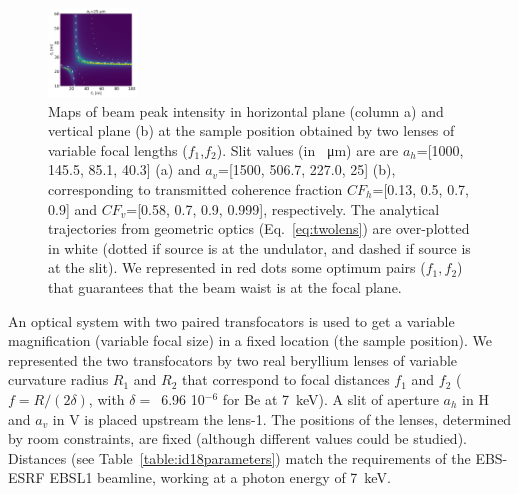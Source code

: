 \documentclass[9pt,twocolumn,twoside]{osajnl}
\begin{document}
\begin{figure}[htbp]
    \includegraphics[width=0.21\textwidth]{figures/V_0.png}
    \caption{
        \label{fig:f1f2map}
    Maps of beam peak intensity in horizontal plane (column a) and vertical plane (b) at the sample position obtained by two lenses of variable focal lengths ($f_1$,$f_2$).
    Slit values (in \SI{}{\micro\meter}) are are $a_h$=[1000, 145.5, 85.1, 40.3] (a) and $a_v$=[1500, 506.7, 227.0, 25] (b), corresponding to transmitted coherence fraction
    $CF_h$=[0.13, 0.5, 0.7, 0.9] and
    $CF_v$=[0.58, 0.7, 0.9, 0.999], respectively.
    The analytical trajectories from geometric optics (Eq.~\ref{eq:twolens}) are over-plotted in white (dotted if source is at the undulator, and dashed if source is at the slit). We represented in red dots some optimum pairs ($f_1,f_2$) that guarantees that the beam waist is at the focal plane.
    }
\end{figure}


An optical system with two paired transfocators is used to get a variable magnification (variable focal size) in a fixed location (the sample position). We represented the two transfocators by two real beryllium lenses of variable curvature radius $R_1$ and $R_2$ that correspond to focal distances $f_1$ and $f_2$ ($f=R/(2 \delta)$, with $\delta=$~6.96 10$^{-6}$ for Be at \SI{7}{keV}). A slit of aperture $a_h$ in H and $a_v$ in V is placed upstream the lens-1. The positions of the lenses, determined by room constraints, are fixed (although different values could be studied). Distances (see Table~\ref{table:id18parameters}) match the requirements of the EBS-ESRF EBSL1 beamline, working at a photon energy of \SI{7}{keV}.
\end{document}

